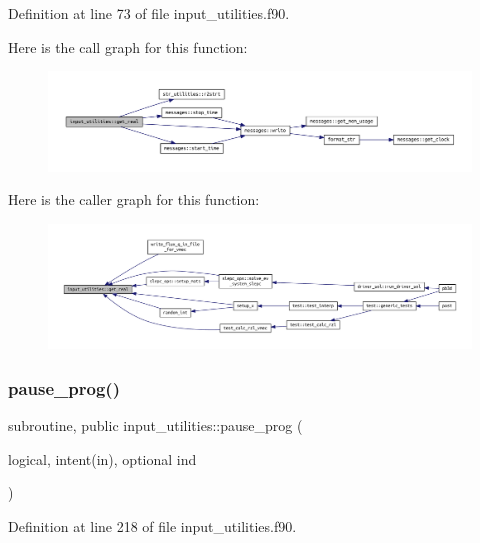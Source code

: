 Definition at line 73 of file input\+\_\+utilities.\+f90.

Here is the call graph for this function\+:
\nopagebreak
\begin{figure}[H]
\begin{center}
\leavevmode
\includegraphics[width=350pt]{namespaceinput__utilities_a41fc0c806e12bc722771210cfa1edbd3_cgraph}
\end{center}
\end{figure}
Here is the caller graph for this function\+:
\nopagebreak
\begin{figure}[H]
\begin{center}
\leavevmode
\includegraphics[width=350pt]{namespaceinput__utilities_a41fc0c806e12bc722771210cfa1edbd3_icgraph}
\end{center}
\end{figure}
\mbox{\label{namespaceinput__utilities_a71bd36f063d55ab62c7a37864aef1185}} 
\subsubsection{\texorpdfstring{pause\+\_\+prog()}{pause\_prog()}}
{\footnotesize\ttfamily subroutine, public input\+\_\+utilities\+::pause\+\_\+prog (\begin{DoxyParamCaption}\item[{logical, intent(in), optional}]{ind }\end{DoxyParamCaption})}



Definition at line 218 of file input\+\_\+utilities.\+f90.

